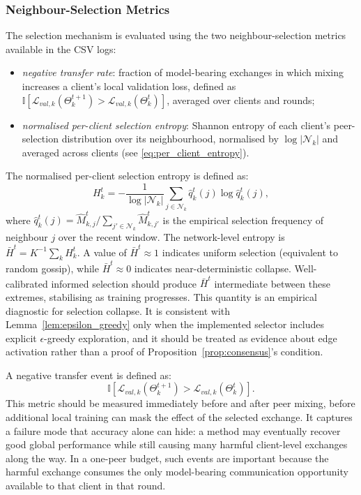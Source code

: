 \documentclass[conference]{IEEEtran}
\newcommand{\rev}[1]{#1}
\begin{document}
\subsubsection{Neighbour-Selection Metrics}
\label{subsubsec:neighbour-selection-metrics}
The selection mechanism is evaluated using the two neighbour-selection metrics available in the CSV logs:
\begin{itemize}
    \item \emph{negative transfer rate}: fraction of model-bearing exchanges in which mixing increases a client's local validation loss, defined as $\mathbb{I}[\mathcal{L}_{val,k}(\Theta_k^{t+1}) > \mathcal{L}_{val,k}(\Theta_k^t)]$, averaged over clients and rounds;
    \item \emph{normalised per-client selection entropy}: Shannon entropy of each client's peer-selection distribution over its neighbourhood, normalised by $\log|\mathcal{N}_k|$ and averaged across clients (see \eqref{eq:per_client_entropy}).
\end{itemize}

The normalised per-client selection entropy is defined as:
\begin{equation}
    H_k^t
    =
    -\frac{1}{\log|\mathcal{N}_k|}
    \sum_{j\in\mathcal{N}_k}
    \hat{q}_k^t(j)\log\hat{q}_k^t(j),
    \label{eq:per_client_entropy}
\end{equation}
where $\hat{q}_k^t(j) = \hat{M}_{k,j}^t / \sum_{j'\in\mathcal{N}_k}\hat{M}_{k,j'}^t$ is the empirical selection frequency of neighbour $j$ over the recent window. The network-level entropy is $\bar{H}^t = K^{-1}\sum_k H_k^t$. A value of $\bar{H}^t \approx 1$ indicates uniform selection (equivalent to random gossip), while $\bar{H}^t \approx 0$ indicates near-deterministic collapse. Well-calibrated informed selection should produce $\bar{H}^t$ intermediate between these extremes, stabilising as training progresses. \rev{This quantity is an empirical diagnostic for selection collapse. It is consistent with Lemma~\ref{lem:epsilon_greedy} only when the implemented selector includes explicit \(\epsilon\)-greedy exploration, and it should be treated as evidence about edge activation rather than a proof of Proposition~\ref{prop:consensus}'s condition.}

A negative transfer event is defined as:
\begin{equation}
    \mathbb{I}\left[
    \mathcal{L}_{val,k}(\Theta_k^{t+1})
    >
    \mathcal{L}_{val,k}(\Theta_k^{t})
    \right].
    \label{eq:auto-102}
\end{equation}
This metric should be measured immediately before and after peer mixing, before additional local training can mask the effect of the selected exchange. It captures a failure mode that accuracy alone can hide: a method may eventually recover good global performance while still causing many harmful client-level exchanges along the way. In a one-peer budget, such events are important because the harmful exchange consumes the only model-bearing communication opportunity available to that client in that round.
\end{document}
